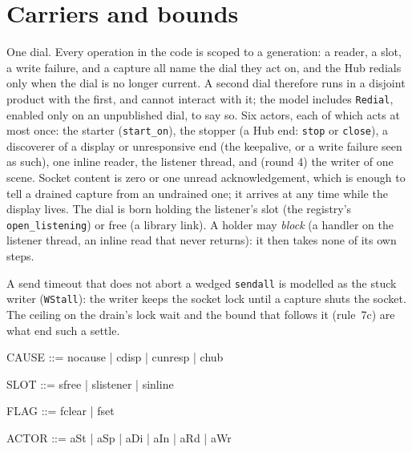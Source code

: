 \documentclass[a4paper,10pt,fleqn]{article}
\begin{document}
\section{Carriers and bounds}

One dial.  Every operation in the code is scoped to a generation: a reader, a
slot, a write failure, and a capture all name the dial they act on, and the Hub
redials only when the dial is no longer current.  A second dial therefore runs
in a disjoint product with the first, and cannot interact with it; the model
includes \texttt{Redial}, enabled only on an unpublished dial, to say so.  Six
actors, each of which acts at most once: the starter (\texttt{start\_on}), the
stopper (a Hub end: \texttt{stop} or \texttt{close}), a discoverer of a display
or unresponsive end (the keepalive, or a write failure seen as such), one inline
reader, the listener thread, and (round 4) the writer of one scene.  Socket content is zero or one unread acknowledgement,
which is enough to tell a drained capture from an undrained one; it arrives at
any time while the display lives.  The dial is born holding the listener's slot
(the registry's \texttt{open\_listening}) or free (a library link).  A holder may
\emph{block} (a handler on the listener thread, an inline read that never
returns): it then takes none of its own steps.

A send timeout that does not abort a wedged \texttt{sendall} is modelled as the
stuck writer (\texttt{WStall}): the writer keeps the socket lock until a capture
shuts the socket.  The ceiling on the drain's lock wait and the bound that
follows it (rule~7c) are what end such a settle.

\begin{zed}
  CAUSE ::= nocause | cdisp | cunresp | chub
\end{zed}

\begin{zed}
  SLOT ::= sfree | slistener | sinline
\end{zed}

\begin{zed}
  FLAG ::= fclear | fset
\end{zed}

\begin{zed}
  ACTOR ::= aSt | aSp | aDi | aIn | aRd | aWr
\end{zed}
\end{document}
